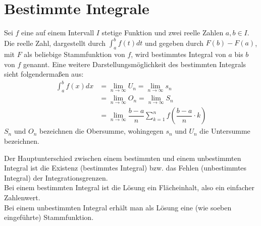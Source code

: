 \documentclass[main.tex]{subfiles}
\begin{document}
\section{Bestimmte Integrale}
\begin{Definition}
  Sei $f$ eine auf einem Intervall $I$ stetige Funktion und zwei reelle Zahlen $a,b\in I$. Die reelle Zahl,
  dargestellt durch  $\displaystyle{\int_a^b f(t)dt}$ und gegeben durch $F(b)-F(a)$, mit $F$ als beliebige Stammfunktion von $f$, wird bestimmtes Integral von $a$ bis $b$ von $f$ genannt.
  Eine weitere Darstellungsmöglichkeit des bestimmten Integrals sieht folgendermaßen aus:
  \begin{align*}
    \int_{a}^{b} f(x)dx & = \lim\limits_{n \rightarrow \infty} U_n = \lim\limits_{n \rightarrow \infty} s_n\\
                        & = \lim\limits_{n \rightarrow \infty} O_n = \lim\limits_{n \rightarrow \infty} S_n\\
                        & = \lim\limits_{n \rightarrow \infty} \dfrac{b-a}{n}\sum\limits_{k=1}^{n}f\left(\dfrac{b-a}{n}\cdot k\right)
  \end{align*}
  $S_n$ und $O_n$ bezeichnen die Obersumme, wohingegen $s_n$ und $U_n$ die Untersumme bezeichnen.
\end{Definition}
\begin{Bemerkung}
  Der Hauptunterschied zwischen einem bestimmten und einem unbestimmten Integral ist die Existenz (bestimmtes Integral) bzw. das Fehlen
  (unbestimmtes Integral) der Integrationsgrenzen.\\
  Bei einem bestimmten Integral ist die Lösung ein Flächeinhalt, also ein einfacher Zahlenwert.\\
  Bei einem unbestimmten Integral erhält man als Lösung eine (wie soeben eingeführte) Stammfunktion.
\end{Bemerkung}
\end{document}
